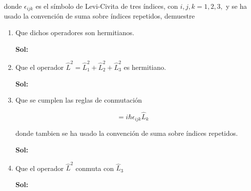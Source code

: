 \documentclass[12pt,a4paper]{article}
\begin{document}
\begin{enumerate}
donde $\epsilon_{ijk}$ es el símbolo de Levi-Civita de tres índices, con $i,j,k = 1,2,3,$ y se ha usado la convención de suma sobre índices repetidos, demuestre

\begin{enumerate}
    \item Que dichos operadores son hermitianos.
    
    \textbf{Sol:}
    
    \item Que el operador $\hat{L}^2 = \hat{L}_{1}^{2} + \hat{L}_{2}^{2} + \hat{L}_{3}^{2}$ es hermitiano.
    
    \textbf{Sol:}
    
    \item Que se cumplen las reglas de conmutación
    
    \begin{equation*}
        [\hat{L}_{i}, \hat{L}_{j}] = i \hbar \epsilon_{ijk} \hat{L}_{k}
    \end{equation*}
    
    donde tambien se ha usado la convención de suma sobre índices repetidos.
    
    \textbf{Sol:}
    
    \item Que el operador $\hat{L}^{2}$ conmuta con $\hat{L}_{3}$
    
    \textbf{Sol:}
\end{enumerate}




\end{enumerate}
\end{document}
